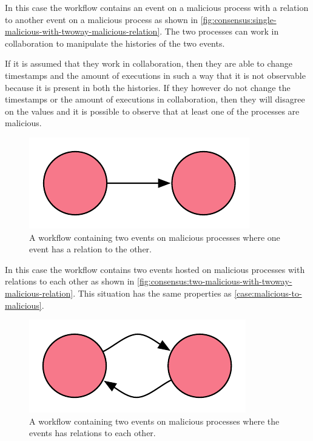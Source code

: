 	\begin{case}
		In this case the workflow contains an event on a malicious process with a relation to another event on a malicious process as shown in \autoref{fig:consensus:single-malicious-with-twoway-malicious-relation}. The two processes can work in collaboration to manipulate the histories of the two events. 
		
		If it is assumed that they work in collaboration, then they are able to change timestamps and the amount of executions in such a way that it is not observable because it is present in both the histories. If they however do not change the timestamps or the amount of executions in collaboration, then they will disagree on the values and it is possible to observe that at least one of the processes are malicious.
		\label{case:malicious-to-malicious}
	\end{case}
	
	\begin{figure}[H]
		\centering
		\includegraphics{6validation/images/4.pdf}
		\caption{A workflow containing two events on malicious processes where one event has a relation to the other.}
		\label{fig:consensus:single-malicious-with-twoway-malicious-relation}
	\end{figure}
	
	\begin{case}
		In this case the workflow contains two events hosted on malicious processes with relations to each other as shown in \autoref{fig:consensus:two-malicious-with-twoway-malicious-relation}. This situation has the same properties as \autoref{case:malicious-to-malicious}.
		\label{case:malicious-to-from-malicious}
	\end{case}

	\begin{figure}[H]
		\centering
		\includegraphics{6validation/images/7.pdf}
		\caption{A workflow containing two events on malicious processes where the events has relations to each other.}
		\label{fig:consensus:two-malicious-with-twoway-malicious-relation}
	\end{figure}
	
